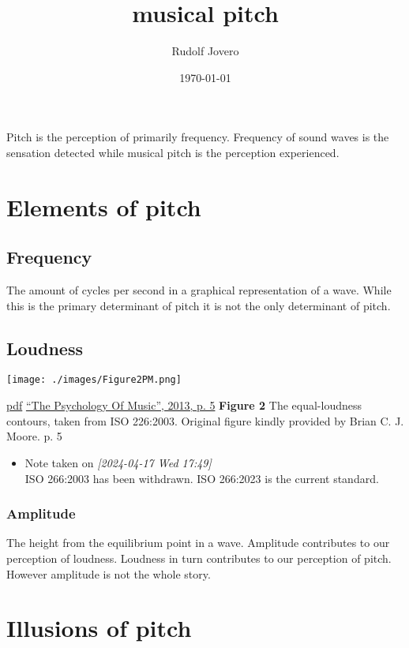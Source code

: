 \documentclass[11pt]{article}
\author{Rudolf Jovero}
\date{\today}
\title{musical pitch}
\makeatletter
\newcommand{\cslcitation}[2]
 {\protect\hyper@linkstart{cite}{citeproc_bib_item_#1}#2\hyper@linkend}
\makeatother
\begin{document}
\maketitle
\tableofcontents

Pitch is the perception of primarily frequency.
Frequency of sound waves is the sensation detected while musical pitch is the perception experienced.
\section{Elements of pitch}
\label{sec:org4e14d0b}
\subsection{Frequency}
\label{sec:org8a26f61}
The amount of cycles per second in a graphical representation of a wave.
While this is the primary determinant of pitch it is not the only determinant of pitch.
\subsection{Loudness}
\label{sec:orgf1561ef}

\begin{center}
\texttt{[image: ./images/Figure2PM.png]}
\end{center}
\href{zotero://open-pdf/library/items/Z85TUTEI?page=5\&annotation=TG3KLECT}{pdf}
\href{zotero://select/library/items/ISHR544U}{“The Psychology Of Music”, 2013, p. 5}
\textbf{\textbf{Figure 2}} The equal-loudness contours, taken from ISO 226:2003.
Original figure kindly provided by Brian C. J. Moore. \cslcitation{1}{p. 5}



\begin{itemize}
\item Note taken on \textit{{[}2024-04-17 Wed 17:49] } \\
ISO 266:2003 has been withdrawn.
ISO 266:2023 is the current standard.
\end{itemize}
\subsubsection{Amplitude}
\label{sec:org01305b4}
The height from the equilibrium point in a wave.
Amplitude contributes to our perception of loudness.
Loudness in turn contributes to our perception of pitch.
However amplitude is not the whole story.
\section{Illusions of pitch}
\label{sec:orga571479}
\end{document}
